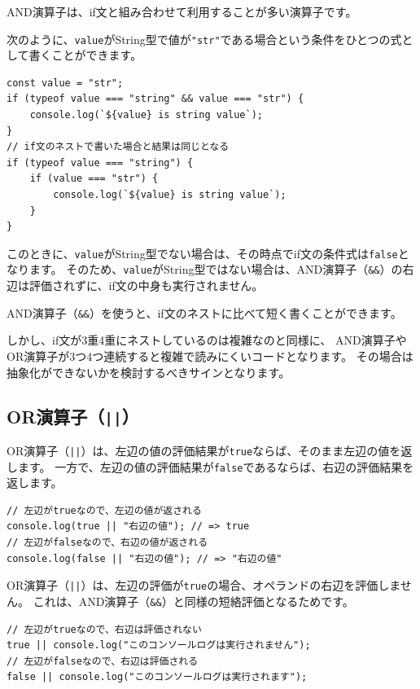 AND演算子は、if文と組み合わせて利用することが多い演算子です。

次のように、\texttt{value}がString型で\textbf{}値が\texttt{"str"}である場合という条件をひとつの式として書くことができます。

\enlargethispage{\baselineskip}\begin{lstlisting}
const value = "str";
if (typeof value === "string" && value === "str") {
    console.log(`${value} is string value`);
}
// if文のネストで書いた場合と結果は同じとなる
if (typeof value === "string") {
    if (value === "str") {
        console.log(`${value} is string value`);
    }
}
\end{lstlisting}

このときに、\texttt{value}がString型でない場合は、その時点でif文の条件式は\texttt{false}となります。
そのため、\texttt{value}がString型ではない場合は、AND演算子（\texttt{\&\&}）の右辺は評価されずに、if文の中身も実行されません。

AND演算子（\texttt{\&\&}）を使うと、if文のネストに比べて短く書くことができます。

しかし、if文が3重4重にネストしているのは複雑なのと同様に、
AND演算子やOR演算子が3つ4つ連続すると複雑で読みにくいコードとなります。
その場合は抽象化ができないかを検討するべきサインとなります。

\hypertarget{or-operator}{%
\subsection{OR演算子（\texttt{||}）}\label{or-operator}}

OR演算子（\texttt{||}）は、左辺の値の評価結果が\texttt{true}ならば、そのまま左辺の値を返します。
一方で、左辺の値の評価結果が\texttt{false}であるならば、右辺の評価結果を返します。

\begin{lstlisting}
// 左辺がtrueなので、左辺の値が返される
console.log(true || "右辺の値"); // => true
// 左辺がfalseなので、右辺の値が返される
console.log(false || "右辺の値"); // => "右辺の値"
\end{lstlisting}

OR演算子（\texttt{||}）は、左辺の評価が\texttt{true}の場合、オペランドの右辺を評価しません。
これは、AND演算子（\texttt{\&\&}）と同様の短絡評価となるためです。

\begin{lstlisting}
// 左辺がtrueなので、右辺は評価されない
true || console.log("このコンソールログは実行されません");
// 左辺がfalseなので、右辺は評価される
false || console.log("このコンソールログは実行されます");
\end{lstlisting}

